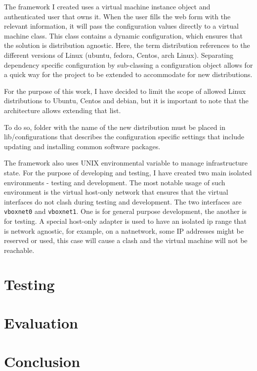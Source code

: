 \documentclass{article}
\begin{document}
The framework I created uses a virtual machine instance object and authenticated user that owns it. When the user fills the web form with the relevant information, it will pass the configuration values directly to a virtual machine class. This class contains a dynamic configuration, which ensures that the solution is distribution agnostic. Here, the term distribution references to the different versions of Linux (ubuntu, fedora, Centos, arch Linux). Separating dependency specific configuration by sub-classing a configuration object allows for a quick way for the project to be extended to accommodate for new distributions.

For the purpose of this work, I have decided to limit the scope of allowed Linux distributions to Ubuntu, Centos and debian, but it is important to note that the architecture allows extending that list.

To do so, folder with the name of the new distribution must be placed in lib/configurations that describes the configuration specific settings that include updating and installing common software packages.

The framework also uses UNIX environmental variable to manage infrastructure state. For the  purpose of developing and testing, I have created two main isolated environments - testing and development.
The most notable usage of such environment is the virtual host-only network that ensures that the virtual interfaces do not clash during testing and development. The two interfaces are \texttt{vboxnet0} and \texttt{vboxnet1}. One is for general purpose development, the another is for testing. A special host-only adapter is used to have an isolated ip range that is network agnostic, for example, on a \gls{natnetwork}, some IP addresses might be reserved or used, this case will cause a clash and the virtual machine will not be reachable.

\newpage


\newpage
\section{Testing}

\newpage
\section{Evaluation}

\newpage
\section{Conclusion}
\end{document}
